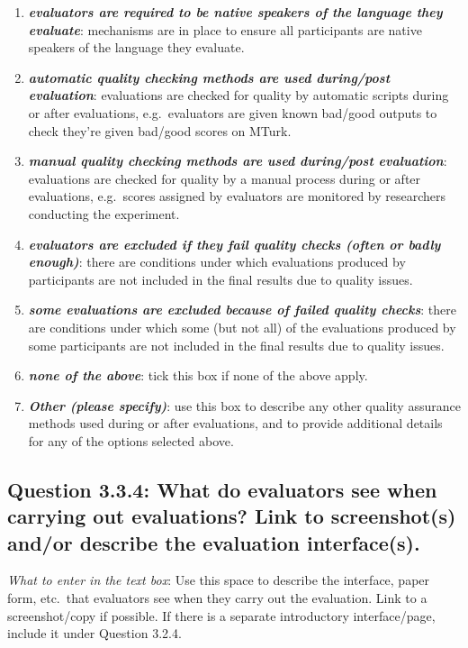 \documentclass[11pt,a4paper]{article}
\newcommand{\egcvalue}[1]{\textbf{\textit{#1}}}
\begin{document}
\begin{enumerate}[itemsep=0cm,leftmargin=0.5cm,label={\small $\square$}]
    \item \egcvalue{evaluators are required to be native speakers of the language they evaluate}: mechanisms are in place to ensure all participants are native speakers of the language they evaluate.
    \item \egcvalue{automatic quality checking methods are used during/post evaluation}: evaluations are checked for quality by automatic scripts during or after evaluations, e.g.\ evaluators are given known bad/good outputs to check they're given bad/good scores on MTurk.
    \item \egcvalue{manual quality checking methods are used during/post evaluation}: evaluations are checked for quality by a manual process  during or after evaluations, e.g.\ scores assigned by evaluators are monitored by researchers conducting the experiment.
    \item \egcvalue{evaluators are excluded if they fail quality checks (often or badly enough)}: there are conditions under which evaluations produced by participants are not included in the final results due to quality issues.
    \item \egcvalue{some evaluations are excluded because of failed quality checks}: there are conditions under which some (but not all) of the evaluations produced by some participants are not included in the final results due to quality issues.
    \item \egcvalue{none of the above}: tick this box if none of the above apply.
    \item \egcvalue{Other (please specify)}: use this box to describe any other quality assurance methods used during or after evaluations, and to provide additional details for any of the options selected above.
\end{enumerate}

\subsection*{Question 3.3.4:  What do evaluators see when carrying out evaluations? Link to screenshot(s) and/or describe the evaluation interface(s).}
\vspace{-.1cm}

\vspace{.3cm}
\noindent\textit{What to enter in the text box}: Use this space to describe the interface, paper form, etc.\ that evaluators see when they carry out the evaluation. Link to a screenshot/copy if possible. If there is a separate introductory interface/page, include it under Question 3.2.4.
\end{document}
